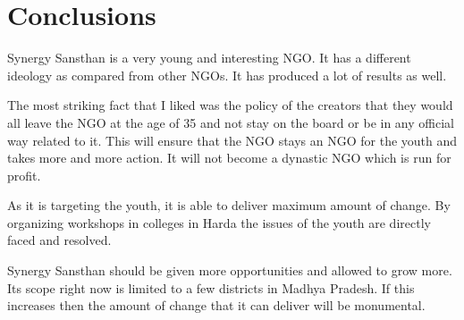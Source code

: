 \def\baselinestretch{1}
\chapter{Conclusions}
\ifpdf
    \graphicspath{{Conclusions/ConclusionsFigs/PNG/}{Conclusions/ConclusionsFigs/PDF/}{Conclusions/ConclusionsFigs/}}
\else
    \graphicspath{{Conclusions/ConclusionsFigs/EPS/}{Conclusions/ConclusionsFigs/}}
\fi

\def\baselinestretch{1.66}

Synergy Sansthan is a very young and interesting NGO. It has a different ideology as compared from other NGOs. It has produced a lot of results as well.

\vspace{1cm}

The most striking fact that I liked was the policy of the creators that they would all leave the NGO at the age of 35 and not stay on the board or be in any official way related to it. This will ensure that the NGO stays an NGO for the youth and takes more and more action. It will not become a dynastic NGO which is run for profit.


\vspace{1cm}
As it is targeting the youth, it is able to deliver maximum amount of change. By organizing workshops in colleges in Harda the issues of the youth are directly faced and resolved.

\vspace{1cm}

Synergy Sansthan should be given more opportunities and allowed to grow more. Its scope right now is limited to a few districts in Madhya Pradesh. If this increases then the amount of change that it can deliver will be monumental.


